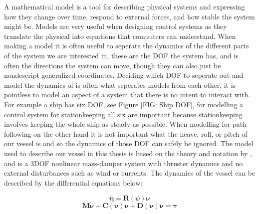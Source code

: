 \fi

A mathematical model is a tool for describing physical systems and expressing how they change over time, respond to external forces, and how stable the system might be. Models are very useful when designing control systems as
they translate the physical into equations that computers can understand. When making a model it is often useful to seperate the dynamics of the different parts of the 
system we are interested in, these are the \gls{DOF} the system has, and is often the directions the system can move, though they can also just be
nondescript generalized coordinates. Deciding which \gls{DOF} to seperate out and model the dynamics of is often what seperates models from each other, it is pointless to model
an aspect of a system that there is no intent to interact with. For example a ship has six \gls{DOF}, see Figure \ref{FIG: Ship DOF}, for modelling a control system for stationkeeping
all six are important because stationkeeping involves keeping the whole ship as steady as possible. When modelling for path following on the other hand it is not
important what the heave, roll, or pitch of our vessel is and so the dynamics of those \gls{DOF} can safely be ignored. 
The model used to describe our vessel in this thesis is based on the theory and notation by \cite{fossen2011handbook}, and is a 3\gls{DOF} nonlinear mass-damper system with
thruster dynamics and no external disturbances such as wind or currents. The dynamics of the vessel can be described by the differential equations below:

\begin{equation} \label{EQ: eta_dot}
    \bm{\dot{\eta}} = \textbf{R}(\psi)\bm{\nu}    
\end{equation}
\begin{equation} \label{EQ: Vessel Dynamics}
    \textbf{M}\bm{\dot{\nu}} + \textbf{C}(\bm{\nu})\bm{\nu} + \textbf{D}(\bm{\nu})\bm{\nu} = \bm{\tau}
\end{equation}

